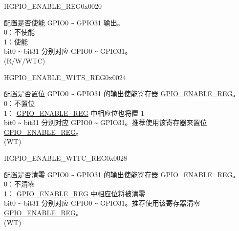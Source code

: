 \begin{register}{H}{GPIO\_ENABLE\_REG}{0x0020}\label{regdesc:GPIOENABLEREG}
%
\regnewline%
\begin{regdesc}\begin{reglist}
\label{fielddesc:GPIOENABLEDATA}\item [GPIO\_ENABLE\_DATA] 配置是否使能 GPIO0 \verb+~+ GPIO31 输出。\\
0：不使能\\
1：使能\\
bit0 \verb+~+ bit31 分别对应 GPIO0 \verb+~+ GPIO31。 \\
(R/W/WTC)
\end{reglist}\end{regdesc}
\end{register}


\begin{register}{H}{GPIO\_ENABLE\_W1TS\_REG}{0x0024}\label{regdesc:GPIOENABLEW1TSREG}
%
\regnewline%
\begin{regdesc}\begin{reglist}
\label{fielddesc:GPIOENABLEW1TS}\item [GPIO\_ENABLE\_W1TS] 配置是否置位 GPIO0 \verb+~+ GPIO31 的输出使能寄存器 \hyperref[regdesc:GPIOENABLEREG]{GPIO\_ENABLE\_REG}。\\
0：不置位\\
1： \hyperref[regdesc:GPIOENABLEREG]{GPIO\_ENABLE\_REG} 中相应位也将置 1 \\
bit0 \verb+~+ bit31 分别对应 GPIO0 \verb+~+ GPIO31。推荐使用该寄存器来置位  \hyperref[regdesc:GPIOENABLEREG]{GPIO\_ENABLE\_REG}。\\
(WT)
\end{reglist}\end{regdesc}
\end{register}


\begin{register}{H}{GPIO\_ENABLE\_W1TC\_REG}{0x0028}\label{regdesc:GPIOENABLEW1TCREG}
%
\regnewline%
\begin{regdesc}\begin{reglist}
\label{fielddesc:GPIOENABLEW1TC}\item [GPIO\_ENABLE\_W1TC] 配置是否清零 GPIO0 \verb+~+ GPIO31 的输出使能寄存器  \hyperref[regdesc:GPIOENABLEREG]{GPIO\_ENABLE\_REG}。\\
0：不清零 \\
 1： \hyperref[regdesc:GPIOENABLEREG]{GPIO\_ENABLE\_REG} 中相应位将被清零 \\
bit0 \verb+~+ bit31 分别对应 GPIO0 \verb+~+ GPIO31。推荐使用该寄存器清零 \hyperref[regdesc:GPIOENABLEREG]{GPIO\_ENABLE\_REG}。\\
(WT)
\end{reglist}\end{regdesc}
\end{register}


